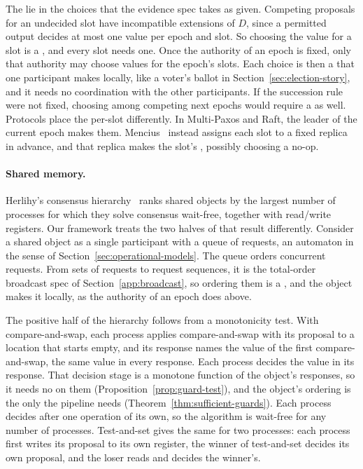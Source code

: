 The \commitments lie in the choices that the evidence spec takes as given.
Competing proposals for an undecided slot have incompatible extensions of $D$,
since a permitted output decides at most one value per epoch and slot.  So
choosing the value for a slot is a \commitment, and every slot needs one.  Once
the authority of an epoch is fixed, only that authority may choose values for
the epoch's slots.  Each choice is then a \commitment that one participant
makes locally, like a voter's ballot in Section~\ref{sec:election-story}, and
it needs no coordination with the other participants.  If the succession rule
were not fixed, choosing among competing next epochs would require a
\commitment as well.  Protocols place the per-slot \commitments differently.
In Multi-Paxos and Raft, the leader of the current epoch makes them.
Mencius~\cite{mao2008mencius} instead assigns each slot to a fixed replica in
advance, and that replica makes the slot's \commitment, possibly choosing a
no-op.

\paragraph{Shared memory.}
Herlihy's consensus hierarchy~\cite{herlihy1991waitfree} ranks shared objects
by the largest number of processes for which they solve consensus wait-free,
together with read/write registers.  Our framework treats the two halves of
that result differently.  Consider a shared object as a single participant
with a queue of requests, an automaton in the sense of
Section~\ref{sec:operational-models}.  The queue orders concurrent requests.
From sets of requests to request sequences, it is the total-order broadcast
spec of Section~\ref{app:broadcast}, so ordering them is a \commitment, and
the object makes it locally, as the authority of an epoch does above.

The positive half of the hierarchy follows from a monotonicity test.  With
compare-and-swap, each process applies compare-and-swap with its proposal to
a location that starts empty, and its response names the value of the first
compare-and-swap, the same value in every response.  Each process decides the
value in its response.  That decision stage is a monotone function of the
object's responses, so it needs no \commitment on them (Proposition~\ref{prop:guard-test}), and the object's ordering is the only \commitment the pipeline needs (Theorem~\ref{thm:sufficient-guards}).  Each process decides after one operation of its own, so the
algorithm is wait-free for any number of processes.  Test-and-set gives the
same for two processes: each process first writes its proposal to its own
register, the winner of test-and-set decides its own proposal, and the loser
reads and decides the winner's.

